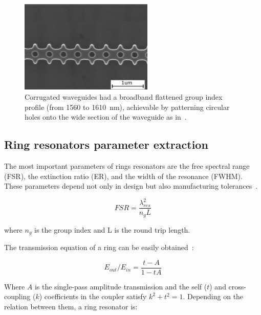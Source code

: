 \documentclass[journal]{IEEEtran}
\begin{document}
\begin{figure}[htb]
	\centering
	\includegraphics[width=2.5in]{corrTEscale}	
	\caption{Corrugated waveguides had a broadband flattened group index profile (from 1560 to 1610~nm), achievable by patterning circular holes onto the wide section of the waveguide as in~\cite{Brimont2010}.}
	\label{fig:sem}
 \end{figure} 


\subsection{Ring resonators parameter extraction}
\label{sec:ringResonators}

The most important parameters of rings resonators are the free spectral range (FSR), the extinction ratio (ER), and the width of the resonance (FWHM). These parameters depend not only in design but also manufacturing tolerances~\cite{Bogaerts:12}.

\begin{equation}
	FSR=\frac{\lambda_{res}^2}{n_gL}
	\label{eq:FSRanillo}
\end{equation} 

where $n_g$ is the group index and L is the round trip length.

The transmission equation of a ring can be easily obtained~\cite{McKinnon2009}:

\begin{equation}
	E_{out}/E_{in}=\frac{t-A}{1-tA}
\label{eq:transmissionRing}
\end{equation}

Where $A$ is the single-pass amplitude transmission and the self ($t$) and cross-coupling ($k$) coefficients in the coupler satisfy $k^2+t^2=1$.
Depending on the relation between them, a ring resonator is:
\end{document}
